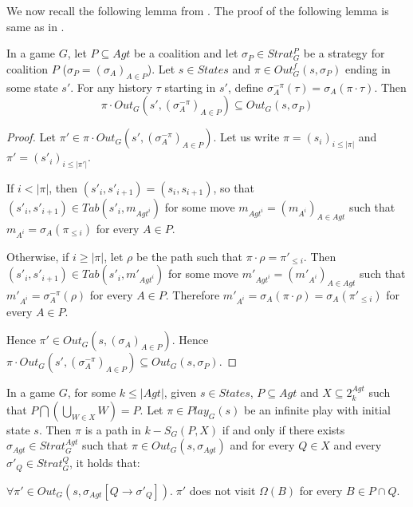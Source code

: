 We now recall the following lemma from \cite{BBM-report}. The proof of the following lemma is same as in \cite{BBM-report}.

\begin{lemma}
\label{lemma4}
In a game $G$, let $P \subseteq Agt$ be a coalition and let $\sigma_{P} \in Strat^{P}_{G}$ be a strategy for coalition $P$ ($\sigma_{P} = (\sigma_{A})_{A \in P}$). Let $s \in States$ and $\pi \in Out^{f}_{G}(s, \sigma_{P})$ ending in some state $s'$. For any history $\tau$ starting in $s'$, define $\sigma_{A}^{-\pi}(\tau) = \sigma_{A}(\pi \cdot \tau)$. Then
\[\pi \cdot Out_{G}(s', (\sigma_{A}^{-\pi})_{A\in P}) \subseteq Out_{G}(s, \sigma_{P})\]
\end{lemma}

\begin{proof}
Let $\pi' \in \pi \cdot Out_{G}(s', (\sigma_{A}^{-\pi})_{A\in P})$. Let us write $\pi = (s_{i})_{i\leq \vert \pi \vert}$ and $\pi' = (s'_{i})_{i\leq \vert \pi' \vert}$.

If $i < \vert \pi \vert$, then $(s'_{i}, s'_{i+1}) = (s_{i}, s_{i+1})$, so that $(s'_{i}, s'_{i+1}) \in Tab(s'_{i}, m_{Agt^{i}})$ for some move $m_{Agt^{i}} = (m_{A^{i}})_{A \in Agt}$ such that $m_{A^{i}} = \sigma_{A}(\pi_{\leq i})$ for every $A \in P$.

Otherwise, if $i \geq \vert \pi \vert$, let $\rho$ be the path such that $\pi \cdot \rho = \pi'_{\leq i}$. Then $(s'_{i}, s'_{i+1}) \in Tab(s'_{i}, m'_{Agt^{i}})$ for some move $m'_{Agt^{i}} = (m'_{A^{i}})_{A\in Agt}$ such that $m'_{A^{i}} = \sigma_{A}^{-\pi}(\rho)$ for every $A \in P$. Therefore $m'_{A^{i}} = \sigma_{A}(\pi \cdot \rho) = \sigma_{A}(\pi'_{\leq i})$ for every $A \in P$.

Hence $\pi' \in Out_{G}(s, (\sigma_{A})_{A\in P})$. Hence $\pi \cdot Out_{G}(s', (\sigma_{A}^{-\pi})_{A\in P}) \subseteq Out_{G}(s, \sigma_{P})$.
\end{proof}

\begin{lemma}
\label{lemma5}
In a game $G$, for some $k \leq \vert Agt \vert$, given $s \in States$, $P \subseteq Agt$ and $X \subseteq 2^{Agt}_{k}$ such that $P \bigcap \left( \bigcup \limits_{W \in X}W \right) = P$. Let $\pi \in Play_{G}(s)$ be an infinite play with initial state $s$. Then $\pi$ is a path in $k-S_{G}(P, X)$ if and only if there exists $\sigma_{Agt} \in Strat^{Agt}_{G}$ such that $\pi \in Out_{G}(s, \sigma_{Agt})$ and for every $Q \in X$ and every $\sigma'_{Q} \in Strat^{Q}_{G}$, it holds that:

$\forall \pi' \in Out_{G}(s, \sigma_{Agt}[Q \rightarrow \sigma'_{Q}]). \; \pi'$ does not visit $\Omega(B)$ for every $B \in P \cap Q$.
\end{lemma}

